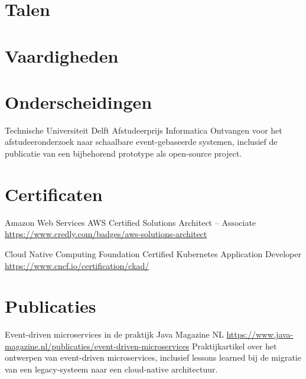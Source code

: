 \documentclass[a4paper, serif, 10pt]{moderncv}
\begin{document}
\section{Talen}

\section{Vaardigheden}

\section{Onderscheidingen}

        {Technische Universiteit Delft}
        {Afstudeerprijs Informatica}
        {}
        {}
        {Ontvangen voor het afstudeeronderzoek naar schaalbare event-gebaseerde
systemen, inclusief de publicatie van een bijbehorend prototype als
open-source project.}
\section{Certificaten}

        {Amazon Web Services}
        {AWS Certified Solutions Architect – Associate}
        {\url{https://www.credly.com/badges/aws-solutions-architect}}
        {}
        {}

        {Cloud Native Computing Foundation}
        {Certified Kubernetes Application Developer}
        {\url{https://www.cncf.io/certification/ckad/}}
        {}
        {}
\section{Publicaties}

        {Event-driven microservices in de praktijk}
        {Java Magazine NL}
        {\url{https://www.java-magazine.nl/publicaties/event-driven-microservices}}
        {}
        {Praktijkartikel over het ontwerpen van event-driven microservices, inclusief
lessons learned bij de migratie van een legacy-systeem naar een
cloud-native architectuur.}
\end{document}
